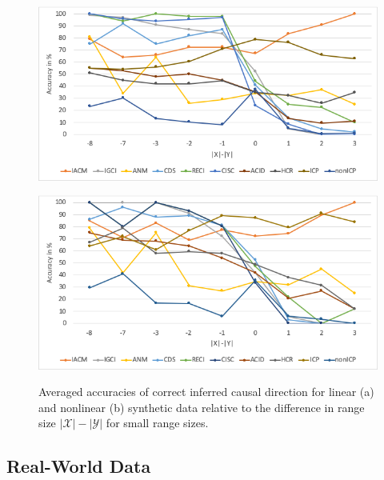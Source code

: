 \documentclass[letterpaper]{article}
\newcommand{\kX}{\mathcal{X}}   %
\newcommand{\kY}{\mathcal{Y}}   %
\begin{document}
\begin{figure}[htb]
\begin{minipage}{\linewidth}
      \begin{minipage}{0.49\linewidth}
 \centering
		  \includegraphics[scale=1.3]{result_linear_discrete.png}
        \subcaption{}
        \label{fig:discrete_linear}
 \end{minipage}
 \hfill
 \begin{minipage}{0.49\linewidth}
\centering
         \includegraphics[scale=1.3]{result_nonlin_discrete.png}
        \subcaption{}
        \label{fig:discrete_nonlinear}
       \end{minipage}
       \caption{Averaged accuracies of correct inferred causal direction for linear (a) and nonlinear (b) synthetic data relative to the difference in range size $|\kX| - |\kY|$ for small range sizes.}
       \label{fig.synthetic_results}
 \end{minipage}
\end{figure}

\subsection{Real-World Data}
\end{document}
